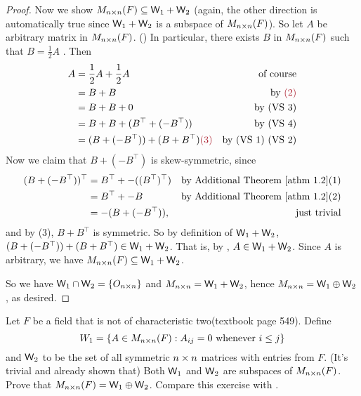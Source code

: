 \begin{proof}
Now we show \(M_{n \times n}(F) \subseteq \textsf{W}_1 + \textsf{W}_2\) (again, the other direction is automatically true since \(\textsf{W}_1 + \textsf{W}_2\) is a subspace of \(M_{n \times n}(F)\)).
So let \(A\) be arbitrary matrix in \(M_{n \times n}(F)\).
()
In particular, there exists \(B\) in \(M_{n \times n}(F)\) such that \(B = \frac1{2} A\) .
Then
\begin{align*}
    A & = \frac1{2} A + \frac1{2} A & \text{of course} \\
      & = B + B & \text{by \MAROON{(2)}} \\
      & = B + B + 0 & \text{by (VS 3)} \\
      & = B + B + (B^\top + (-B^\top)) & \text{by (VS 4)} \\
      & = (B + (-B^\top)) + (B + B^\top) \MAROON{(3)}  & \text{by (VS 1) (VS 2)}
\end{align*}
Now we claim that \(B + (-B^\top)\) is skew-symmetric, since
\begin{align*}
    (B + (-B^\top))^\top & = B^\top + -((B^\top)^\top) & \text{by \ATHM{1.2}(1)} \\
                   & = B^\top + -B & \text{by \ATHM{1.2}(2)} \\
                   & = -(B + (-B^\top)), & \text{just trivial}
\end{align*}
and by (3), \(B + B^\top\) is symmetric.
So by definition of \(\textsf{W}_1 + \textsf{W}_2\), \((B + (-B^\top)) + (B + B^\top) \in \textsf{W}_1 + \textsf{W}_2\).
That is, by , \(A \in \textsf{W}_1 + \textsf{W}_2\).
Since \(A\) is arbitrary, we have \(M_{n \times n}(F) \subseteq \textsf{W}_1 + \textsf{W}_2\).

So we have \(\textsf{W}_1 \cap \textsf{W}_2 = \{ O_{n \times n} \}\) and \(M_{n \times n} = \textsf{W}_1 + \textsf{W}_2\), hence \(M_{n \times n} = \textsf{W}_1 \oplus \textsf{W}_2\), as desired.
\end{proof}

\begin{exercise} \label{exercise 1.3.29}
Let \(F\) be a field that is not of characteristic two(textbook page 549).
Define
\[
    W_1 = \{ A \in M_{n \times n}(F) : A_{ij} = 0 \text{ whenever } i \le j \}
\]
and \(\textsf{W}_2\) to be the set of all symmetric \(n \times n\) matrices with entries from \(F\).
(It's trivial and already shown that) Both \(\textsf{W}_1\) and \(\textsf{W}_2\) are subspaces of \(M_{n \times n}(F)\).
Prove that \(M_{n \times n}(F) = \textsf{W}_1 \oplus \textsf{W}_2\).
Compare this exercise with .
\end{exercise}

